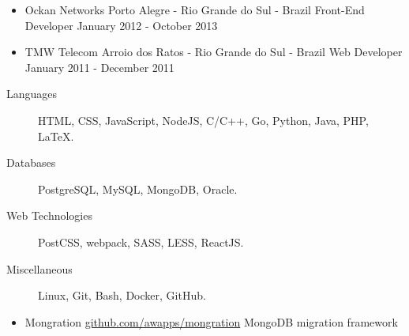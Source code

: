 \documentclass[letterpaper,11pt]{article}
\begin{document}
\begin{itemize}
        \item
            \ressubheading
                {Ockan Networks}
                {Porto Alegre - Rio Grande do Sul - Brazil}
                {Front-End Developer}
                {January 2012 - October 2013}
            \begin{itemize}
            \end{itemize}

        \item
            \ressubheading
                {TMW Telecom}
                {Arroio dos Ratos - Rio Grande do Sul - Brazil}
                {Web Developer}
                {January 2011 - December 2011}
            \begin{itemize}
            \end{itemize}
    \end{itemize}

    \begin{description}
        \item[Languages]
            HTML, CSS, JavaScript, NodeJS, C/C++, Go, Python, Java, PHP, \LaTeX.
        \item[Databases]
            PostgreSQL, MySQL, MongoDB, Oracle.
        \item[Web Technologies]
            PostCSS, webpack, SASS, LESS, ReactJS.
        \item[Miscellaneous]
            Linux, Git, Bash, Docker, GitHub.
    \end{description}

    \begin{itemize}
        \item
            \ressubheading
                {Mongration}
                {\href{https://github.com/awapps/mongration}{github.com/awapps/mongration}}
                {MongoDB migration framework}
                {}
    \end{itemize}
\end{document}

